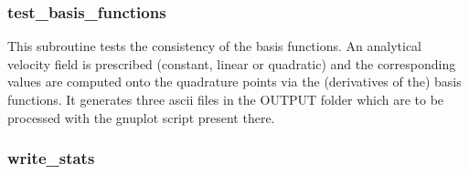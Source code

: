  \subsubsection{test\_basis\_functions}
 This subroutine tests the consistency of the basis functions. 
 An analytical velocity field is prescribed (constant, linear or quadratic) and the 
 corresponding values are computed onto the quadrature points via the 
 (derivatives of the) basis functions.
 It generates three ascii files in the {\foldernamefont OUTPUT} folder which 
 are to be processed with the gnuplot script present there.
 \subsubsection{write\_stats}


